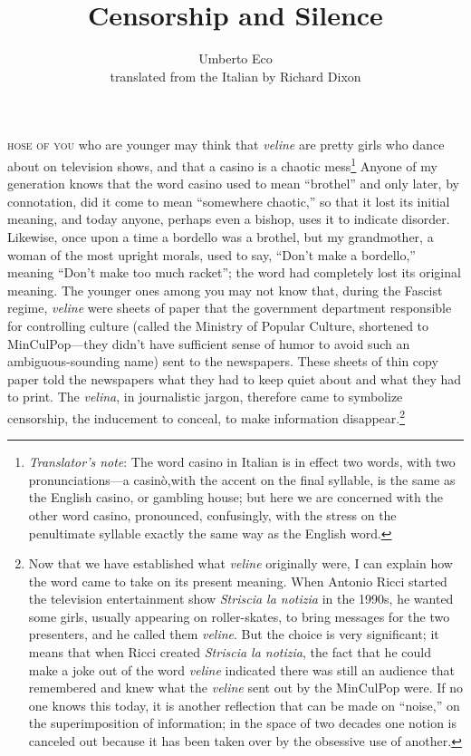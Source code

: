 \documentclass[11pt,twocolumn]{article}
\title{Censorship and Silence}
\author{Umberto Eco \\ \small \textsf{translated from the Italian by Richard Dixon}}
\date{}
\begin{document}
\maketitle

\lettrine[lraise=0.15,nindent=0.4em,lines=2]{}{hose of you}
who are younger may think that \emph{veline}
are pretty girls who dance about on television shows, and that a
casino is a chaotic mess\footnote{\emph{Translator's note}: The
word casino in Italian is in effect two words, with two pronunciations---a
casin\`o,with the accent on the final syllable, is the same as the
English casino, or gambling house; but here we are concerned with
the other word casino, pronounced, confusingly, with the stress on
the penultimate syllable exactly the same way as the English word.}
Anyone of my generation knows that the word casino used to mean
``brothel'' and only later, by connotation, did it come to mean
``somewhere chaotic,'' so that it lost its initial meaning, and
today anyone, perhaps even a bishop, uses it to indicate disorder.
Likewise, once upon a time a bordello was a brothel, but my
grandmother, a woman of the most upright morals, used to say, ``Don't
make a bordello,'' meaning ``Don't make too much racket''; the word
had completely lost its original meaning. The younger ones among
you may not know that, during the Fascist regime, \emph{veline}
were sheets of paper that the government department responsible for
controlling culture (called the Ministry of Popular Culture, shortened
to MinCulPop---they didn't have sufficient sense of humor to avoid
such an ambiguous-sounding name) sent to the newspapers. These
sheets of thin copy paper told the newspapers what they had to keep
quiet about and what they had to print. The \emph{velina}, in
journalistic jargon, therefore came to symbolize censorship, the
inducement to conceal, to make information disappear.\footnote{
Now that we have established what \emph{veline} originally were, I
can explain how the word came to take on its present meaning.  When
Antonio Ricci started the television entertainment show \emph{Striscia
la notizia} in the 1990s, he wanted some girls, usually appearing
on roller-skates, to bring messages for the two presenters, and he
called them \emph{veline}.  But the choice is very significant; it
means that when Ricci created \emph{Striscia la notizia}, the fact
that he could make a joke out of the word \emph{veline} indicated
there was still an audience that remembered and knew what the
\emph{veline} sent out by the MinCulPop were. If no one knows this
today, it is another reflection that can be made on ``noise,'' on
the superimposition of information; in the space of two decades one
notion is canceled out because it has been taken over by the obsessive
use of another.}
\end{document}

